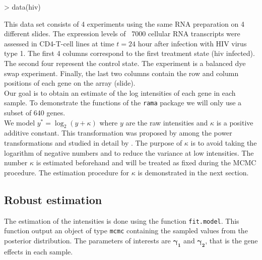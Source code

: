 \documentclass[11pt]{article}
\begin{document}
\begin{Schunk}
\begin{Sinput}
> data(hiv)
\end{Sinput}
\end{Schunk}

 
This data set consists of 4 experiments using the same RNA preparation on 4 
different slides. The expression levels of ~7000 cellular RNA transcripts were assessed
in CD4-T-cell lines at time $t=24$ hour after infection with HIV virus
type 1. The first 4 columns correspond to the first treatment state (hiv
infected). The second four represent the control state. The experiment
is a balanced dye swap experiment. Finally, the last two columns
  contain the row and column positions of each gene on the array (slide). \\

Our goal is to obtain an estimate of the log intensities of each gene in each sample. 
To demonstrate the functions of the {\tt rama} package we will only use a subset of 640 genes. \\

We model $y^*=\log_2(y+\kappa)$ where $y$ are the raw intensities and $\kappa$ is a positive additive constant. 
This transformation was proposed by  among the power transformations and studied in detail by 
. 
The purpose of $\kappa$ is to avoid taking the logarithm of negative numbers and to reduce the variance at low intensities. 
The number $\kappa$ is estimated beforehand and will be treated as fixed during the MCMC procedure. The estimation procedure for 
$\kappa$ is demonstrated in the next section. 

\subsection{Robust estimation}
The estimation of the intensities is done using the function {\tt fit.model}.
This function output an object of type {\tt mcmc} containing the sampled values from the
posterior distribution. The parameters of interests are $\boldsymbol{\gamma_1}$ and 
$\boldsymbol{\gamma_2}$, that is the gene effects in each sample. \\
\end{document}
